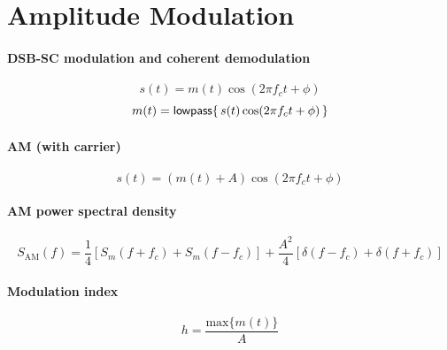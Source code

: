 \section*{Amplitude Modulation}

\paragraph{DSB-SC modulation and coherent demodulation}
\begin{equation}
s(t) = m(t) \cos(2 \pi f_c t + \phi)
\label{eq:am-dsb}
\end{equation}
\[
m(t) = \textrm{\textsf{lowpass}} \{ \, s(t) \cos(2 \pi f_c t +  \phi) \, \}
\]

\paragraph{AM (with carrier)}
\begin{equation}
s(t) = (m(t) + A) \cos(2 \pi f_c t + \phi)
\label{eq:amSignal}
\end{equation}

\paragraph{AM power spectral density}
\begin{equation}
S_{\textrm{AM}}(f) = \frac{1}{4} \left[S_m(f+f_c) + S_m(f-f_c) \right] + \frac{A^2}{4} \left[ \delta(f-f_c) +  \delta(f+f_c) \right]
\label{eq:amPSD}
\end{equation}

\paragraph{Modulation index}
\begin{equation}
h = \frac{\textrm{max}\{m(t)\}}{A}
\label{eq:amModulationIndex}
\end{equation}

%

